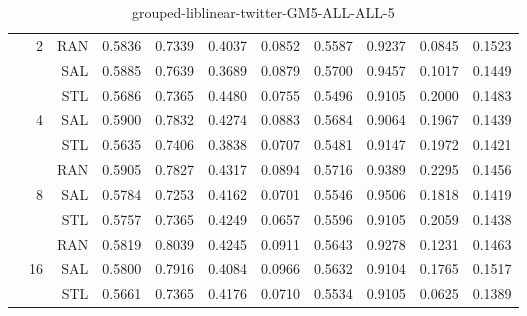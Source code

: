 \begin{center}
\begin{table}[htbp]
\begin{tabular}{ | r | r | r | r | r | r | r | r | r | r | r |}
 & \multirow{3}{*}{2} & RAN & 0.5836 & 0.7339 & 0.4037 & 0.0852 & 0.5587 & 0.9237 & 0.0845 & 0.1523\\ \cline{3-11}
 &   & SAL & 0.5885 & 0.7639 & 0.3689 & 0.0879 & 0.5700 & 0.9457 & 0.1017 & 0.1449\\ \cline{3-11}
 &   & STL & 0.5686 & 0.7365 & 0.4480 & 0.0755 & 0.5496 & 0.9105 & 0.2000 & 0.1483\\ \cline{2-11}
 & \multirow{3}{*}{4} & SAL & 0.5900 & 0.7832 & 0.4274 & 0.0883 & 0.5684 & 0.9064 & 0.1967 & 0.1439\\ \cline{3-11}
 &   & STL & 0.5635 & 0.7406 & 0.3838 & 0.0707 & 0.5481 & 0.9147 & 0.1972 & 0.1421\\ \cline{3-11}
 &   & RAN & 0.5905 & 0.7827 & 0.4317 & 0.0894 & 0.5716 & 0.9389 & 0.2295 & 0.1456\\ \cline{2-11}
 & \multirow{3}{*}{8} & SAL & 0.5784 & 0.7253 & 0.4162 & 0.0701 & 0.5546 & 0.9506 & 0.1818 & 0.1419\\ \cline{3-11}
 &   & STL & 0.5757 & 0.7365 & 0.4249 & 0.0657 & 0.5596 & 0.9105 & 0.2059 & 0.1438\\ \cline{3-11}
 &   & RAN & 0.5819 & 0.8039 & 0.4245 & 0.0911 & 0.5643 & 0.9278 & 0.1231 & 0.1463\\ \cline{2-11}
 & \multirow{3}{*}{16} & SAL & 0.5800 & 0.7916 & 0.4084 & 0.0966 & 0.5632 & 0.9104 & 0.1765 & 0.1517\\ \cline{3-11}
 &   & STL & 0.5661 & 0.7365 & 0.4176 & 0.0710 & 0.5534 & 0.9105 & 0.0625 & 0.1389\\ \cline{3-11}
\hline
\end{tabular}
\caption{grouped-liblinear-twitter-GM5-ALL-ALL-5}
\end{table}
\end{center}


